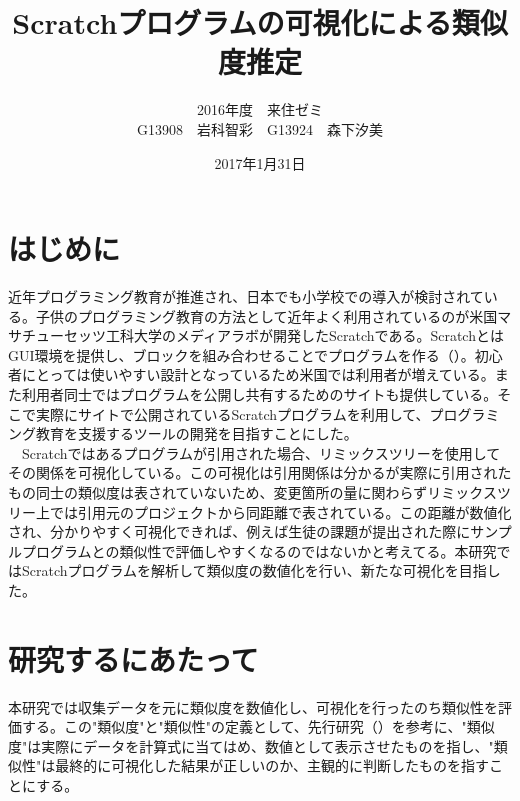 \documentclass[twocolumn,9pt,a4paper]{jsarticle}
\title{Scratchプログラムの可視化による類似度推定}
\author{2016年度　来住ゼミ
\\
G13908　岩科智彩　G13924　森下汐美}
\date{2017年1月31日}
\begin{document}
\maketitle
%
%
\section{はじめに}
近年プログラミング教育が推進され、日本でも小学校での導入が検討されている。子供のプログラミング教育の方法として近年よく利用されているのが米国マサチューセッツ工科大学のメディアラボが開発したScratchである。ScratchとはGUI環境を提供し、ブロックを組み合わせることでプログラムを作る（\cite{scratch}）。初心者にとっては使いやすい設計となっているため米国では利用者が増えている。また利用者同士ではプログラムを公開し共有するためのサイトも提供している。そこで実際にサイトで公開されているScratchプログラムを利用して、プログラミング教育を支援するツールの開発を目指すことにした。
\\
　Scratchではあるプログラムが引用された場合、リミックスツリーを使用してその関係を可視化している。この可視化は引用関係は分かるが実際に引用されたもの同士の類似度は表されていないため、変更箇所の量に関わらずリミックスツリー上では引用元のプロジェクトから同距離で表されている。この距離が数値化され、分かりやすく可視化できれば、例えば生徒の課題が提出された際にサンプルプログラムとの類似性で評価しやすくなるのではないかと考えてる。本研究ではScratchプログラムを解析して類似度の数値化を行い、新たな可視化を目指した。

\section{研究するにあたって}
本研究では収集データを元に類似度を数値化し、可視化を行ったのち類似性を評価する。この"類似度"と"類似性"の定義として、先行研究（\cite{preEssay2}）を参考に、"類似度"は実際にデータを計算式に当てはめ、数値として表示させたものを指し、"類似性"は最終的に可視化した結果が正しいのか、主観的に判断したものを指すことにする。
\end{document}
